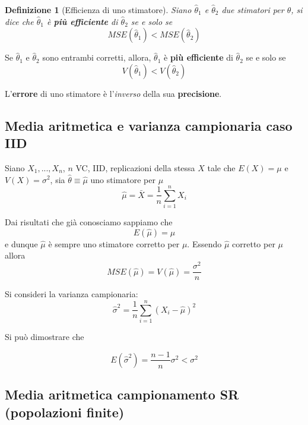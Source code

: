 \documentclass[
  11pt,
]{book}
\theoremstyle{mytheoremstyle}
\theoremstyle{mydefstyle}
\newtheorem{definition}{Definizione}[section]
\newenvironment{nota}
  {
\begin{tcolorbox}[enhanced,breakable,arc=0.1mm,boxrule=1pt,colback=white,colframe=iblue,title=\bf \fontfamily{lmss}\selectfont \faInfoCircle \hspace{.5 cm} Nota,drop fuzzy shadow]
}{
\end{tcolorbox}
  }
\begin{document}
\begin{info}

\begin{definition}[Efficienza di uno stimatore]
Siano \(\hat\theta_1\) e \(\hat\theta_2\) due stimatori per \(\theta\), si dice che \(\hat\theta_1\) è \textbf{più efficiente} di \(\hat\theta_2\) se e solo se
\[MSE(\hat\theta_1)<MSE(\hat\theta_2)\]
\end{definition}

\end{info}

\begin{nota}
Se \(\hat\theta_1\) e \(\hat\theta_2\) sono entrambi corretti, allora, \(\hat\theta_1\) è \textbf{più efficiente} di \(\hat\theta_2\) se e solo se
\[V(\hat\theta_1)<V(\hat\theta_2)\]

L'\textbf{errore} di uno stimatore è l'\emph{inverso} della sua \textbf{precisione}.

\end{nota}

\subsection{Media aritmetica e varianza campionaria caso IID}\label{media-aritmetica-e-varianza-campionaria-caso-iid}

Siano \(X_1,...,X_n\), \(n\) VC, IID, replicazioni della stessa \(X\) tale che \(E(X)=\mu\) e \(V(X)=\sigma^2\), sia \(\hat\theta\equiv\hat \mu\) uno stimatore per \(\mu\)
\[
\hat \mu=\bar X=\frac 1 n \sum_{i=1}^n X_i
\]

Dai risultati che già conosciamo sappiamo che
\[
E(\hat \mu)=\mu
\]
e dunque \(\hat \mu\) è sempre uno stimatore corretto per \(\mu\).
Essendo \(\hat \mu\) corretto per \(\mu\) allora
\[MSE(\hat \mu)=V(\hat \mu)=\frac{\sigma^2}n\]

Si consideri la varianza campionaria:
\[
\hat\sigma^2=\frac 1 n \sum_{i=1}^n(X_i-\hat \mu)^2
\]

Si può dimostrare che

\begin{info}
\[
E(\hat \sigma^2)=\frac {n-1}n \sigma^2<\sigma^2
\]

\end{info}

\subsection{Media aritmetica campionamento SR (popolazioni finite)}\label{media-aritmetica-campionamento-sr-popolazioni-finite}
\end{document}
